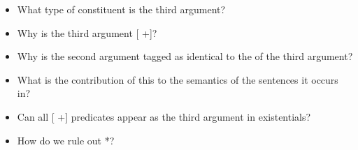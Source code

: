 \documentclass[a4paper,landscape,headrule,footrule,dvips]{foils}
\begin{document}

\begin{itemize}
\item What type of constituent is the third argument?
\item Why is the third argument [ +]?
\item Why is the second argument tagged as identical to the 
  of the third argument?
\end{itemize}

\begin{center}
  \begin{tiny}
  \end{tiny}
\end{center}


\begin{itemize}
\item What is the contribution of this  to the semantics of the sentences 
it occurs in?
\item Can all [ +] predicates appear as the third argument in 
existentials?
\item How do we rule out *?  
\end{itemize}

\begin{center}
  \begin{tiny}
  \end{tiny}
\end{center}
\end{document}
